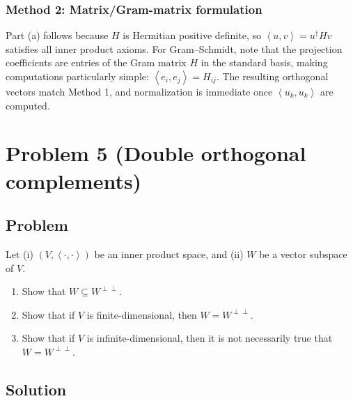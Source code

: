 \documentclass[12pt]{article}
\newcommand{\ip}[2]{\left\langle #1,#2\right\rangle}
\begin{document}
\subsubsection{Method 2: Matrix/Gram-matrix formulation}
Part (a) follows because $H$ is Hermitian positive definite, so $\ip{u}{v}=u^\dagger Hv$ satisfies all inner product axioms.
For Gram--Schmidt, note that the projection coefficients are entries of the Gram matrix $H$ in the standard basis, making computations
particularly simple: $\ip{e_i}{e_j}=H_{ij}$. The resulting orthogonal vectors match Method 1, and normalization is immediate once
$\ip{u_k}{u_k}$ are computed.

\newpage
\section{Problem 5 (Double orthogonal complements)}
\subsection{Problem}
Let (i) $(V,\ip{\cdot}{\cdot})$ be an inner product space, and (ii) $W$ be a vector subspace of $V$.
\begin{enumerate}[label=(\alph*)]
\item Show that $W\subseteq W^{\perp\perp}$.
\item Show that if $V$ is finite-dimensional, then $W=W^{\perp\perp}$.
\item Show that if $V$ is infinite-dimensional, then it is not necessarily true that $W=W^{\perp\perp}$.
\end{enumerate}

\subsection{Solution}
\end{document}
